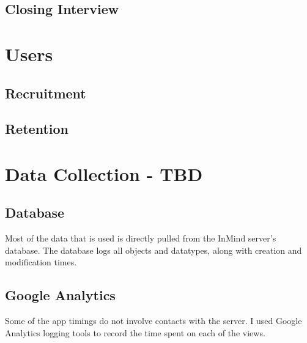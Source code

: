   \subsection{Closing Interview}

\section{Users}

  \subsection{Recruitment}

  \subsection{Retention}

\section{Data Collection - TBD}
  \subsection{Database}
    Most of the data that is used is directly pulled from
    the InMind server's database.
    The database logs all objects and datatypes,
    along with creation and modification times.

  \subsection{Google Analytics}
    Some of the app timings do not involve contacts with the server.
    I used Google Analytics logging tools to record the time spent
    on each of the views.

